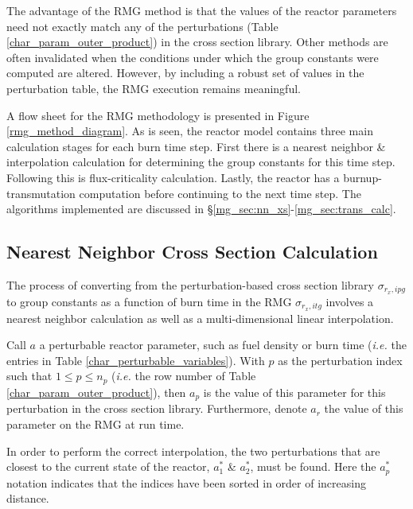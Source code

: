 The advantage of the RMG method is that the values of the reactor parameters
need not exactly match any of the perturbations (Table \ref{char_param_outer_product}) in the 
cross section library.  Other methods are often invalidated when the conditions under which 
the group constants were computed are altered.  However, by including a robust set of values
in the perturbation table, the RMG execution remains meaningful.



A flow sheet for the RMG methodology is presented in Figure \ref{rmg_method_diagram}.  As is
seen, the reactor model contains three main calculation stages for each burn time step.
First there is a nearest neighbor \& interpolation calculation for determining the group
constants for this time step.  Following this is flux-criticality calculation.  Lastly, the reactor
has a burnup-transmutation computation before continuing to the next time step.  The algorithms
implemented are discussed in \S \ref{mg_sec:nn_xs}-\ref{mg_sec:trans_calc}.


\subsection{Nearest Neighbor Cross Section Calculation}
\label{mg_sec:nn_xs}
The process of converting from the perturbation-based cross section library $\sigma_{r_x,ipg}$ to 
group constants as a function of burn time in the RMG $\sigma_{r_x,itg}$ involves a nearest 
neighbor calculation as well as a multi-dimensional linear interpolation.

Call $a$ a perturbable reactor parameter, such as fuel density or burn time (\emph{i.e.} the 
entries in Table \ref{char_perturbable_variables}).   With $p$ as the perturbation index 
such that $1 \le p \le n_p$ (\emph{i.e.} the row number of Table \ref{char_param_outer_product}), 
then $a_p$ is the value of this parameter for this perturbation in the cross section library.  
Furthermore, denote $a_r$ the value of this parameter on the RMG at run time.

In order to perform the correct interpolation, the two perturbations that are closest to the current
state of the reactor, $a_1^*$ \& $a_2^*$, must be found.  Here the $a_p^*$ notation indicates that 
the indices have been sorted in order of increasing distance.  

